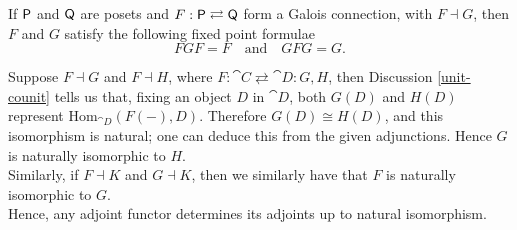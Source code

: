 
\vspace*{0.1in}

\begin{corollary}
If $\mathsf{P}$ and $\mathsf{Q}$ are posets and $F : \mathsf{P} \rightleftarrows \mathsf{Q}$ form a Galois connection, with $F \dashv G$, then $F$ and $G$ satisfy the following fixed point formulae
\[FGF = F \quad \text{and} \quad GFG = G.\]
\end{corollary}

\vspace*{0.1in}

\begin{remark}
Suppose $F \dashv G$ and $F \dashv H$, where $F: \cat{C} \rightleftarrows \cat{D}:G,H$, then Discussion \ref{unit-counit} tells us that, fixing an object $D$ in $\cat{D}$, both $G(D)$ and $H(D)$ represent $\mathrm{Hom}_{\cat{D}}(F(-),D)$. Therefore $G(D) \cong H(D)$, and this isomorphism is natural; one can deduce this from the given adjunctions. Hence $G$ is naturally isomorphic to $H$.\\[0.5em]
Similarly, if $F \dashv K$ and $G \dashv K$, then we similarly have that $F$ is naturally isomorphic to $G$.\\[1em]
Hence, any adjoint functor determines its adjoints up to natural isomorphism.
\end{remark}

\vspace*{0.2in}

